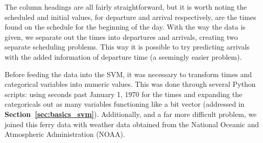 \documentclass[11pt]{article} %
\begin{document}
The column headings are all fairly straightforward, but it is worth noting the
scheduled and initial values, for departure and arrival respectively, are the
times found on the schedule for the beginning of the day. With the way the data
is given, we separate out the times into departures and arrivals, creating two
separate scheduling problems. This way it is possible to try predicting arrivals
with the added information of departure time (a seemingly easier problem). 

Before feeding the data into the SVM, it was necessary to transform times and 
categorical variables into numeric values. This was done through several Python
scripts: using seconds past January 1, 1970 for the times and expanding the 
categoricals out as many variables functioning like a bit vector (addressed in 
\textbf{Section~\ref{sec:basics_svm}}). Additionally,
and a far more difficult problem, we joined this ferry data with weather data
obtained from the National Oceanic and Atmospheric Administration (NOAA).

% 
% 
\end{document}
